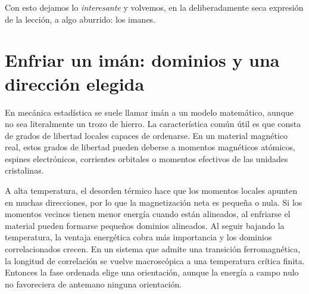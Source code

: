 \begin{classroomqa}\end{classroomqa}

Con esto dejamos lo \emph{interesante} y volvemos, en la deliberadamente seca expresión de la lección, a algo aburrido: los imanes.

\section{Enfriar un imán: dominios y una dirección elegida}

En mecánica estadística se suele llamar imán a un modelo matemático, aunque no sea literalmente un trozo de hierro. La característica común útil es que consta de grados de libertad locales capaces de ordenarse. En un material magnético real, estos grados de libertad pueden deberse a momentos magnéticos atómicos, espines electrónicos, corrientes orbitales o momentos efectivos de las unidades cristalinas.

A alta temperatura, el desorden térmico hace que los momentos locales apunten en muchas direcciones, por lo que la magnetización neta es pequeña o nula. Si los momentos vecinos tienen menor energía cuando están alineados, al enfriarse el material pueden formarse pequeños dominios alineados. Al seguir bajando la temperatura, la ventaja energética cobra más importancia y los dominios correlacionados crecen. En un sistema que admite una transición ferromagnética, la longitud de correlación se vuelve macroscópica a una temperatura crítica finita. Entonces la fase ordenada elige una orientación, aunque la energía a campo nulo no favoreciera de antemano ninguna orientación.

\begin{classroomqa}\end{classroomqa}

